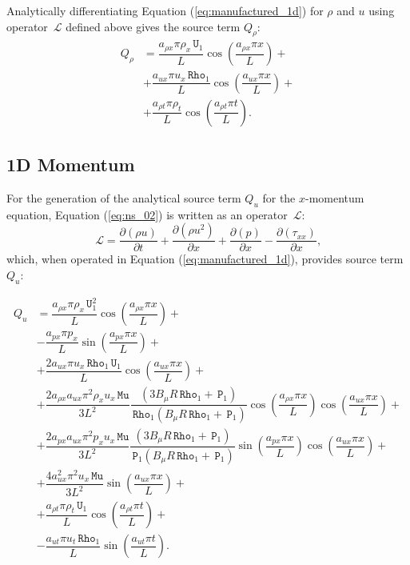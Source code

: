 \documentclass[10pt]{article}
\newcommand{\Diff}[2] {\dfrac{\partial( #1)}{\partial #2}}
\newcommand{\Rho}{\,\mathtt{Rho}}
\newcommand{\PP}{\,\mathtt{P}}
\newcommand{\U}{\,\mathtt{U}}
\newcommand{\Lo}{\,\mathcal{L}}
\newcommand{\MU}{\,\mathtt{Mu}}
\begin{document}
Analytically differentiating Equation (\ref{eq:manufactured_1d}) for $\rho$ and $u$  using operator $\Lo$ defined above gives  the source term $Q_{\rho}$:
\begin{equation}
 \begin{split}
Q_\rho &= \dfrac{a_{\rho x} \pi \rho_x \U_1}{L}\cos\left(\dfrac{a_{\rho x} \pi x}{L}\right) +\\
&+\dfrac{a_{ux} \pi u_x \Rho_1}{L}\cos\left(\dfrac{a_{ux} \pi x}{L}\right)+\\
&+\dfrac{a_{\rho t} \pi \rho_t }{L}\cos\left(\dfrac{a_{\rho t} \pi t}{L}\right) .
 \end{split}
\end{equation}


\subsection{1D Momentum}

For the generation of the analytical source term $Q_u$ for the $x$-momentum equation, Equation  (\ref{eq:ns_02}) is written as an  operator $\Lo$:
\begin{equation*}
 \Lo=\Diff{\rho u}{t} +\Diff{\rho u^2 }{x}+ \Diff{p}{x} -\Diff{\tau_{xx}}{x},
\end{equation*}
which, when operated in Equation (\ref{eq:manufactured_1d}), provides source term $Q_{u}$:

\begin{equation}
 \begin{split}
Q_u&=\dfrac{a_{\rho x} \pi \rho_x \U_1^2}{L}\cos\left(\dfrac{a_{\rho x} \pi x}{L}\right) +\\
&-\dfrac{ a_{px} \pi p_x}{L}\sin\left(\dfrac{a_{px} \pi x}{L}\right) +\\
&+  \dfrac{2a_{ux} \pi u_x \Rho_1 \U_1}{L}\cos\left(\dfrac{a_{ux} \pi x}{L}\right)+\\
&+ \dfrac{2 a_{\rho x} a_{ux} \pi^2 \rho_x u_x \MU}{3L^2}\dfrac{ (3 B_\mu R \Rho_1 +\PP_1) }{\Rho_1  (B_\mu R \Rho_1 +\PP_1)  }\cos\left(\dfrac{a_{\rho x} \pi x}{L}\right) \cos\left(\dfrac{a_{ux} \pi x}{L}\right)  +\\
&+\dfrac{2 a_{px} a_{ux} \pi^2 p_x u_x \MU}{3L^2}\dfrac{(3 B_\mu R \Rho_1 +\PP_1) }{\PP_1 (B_\mu R \Rho_1 +\PP_1)  } \sin\left(\dfrac{a_{px} \pi x}{L}\right) \cos\left(\dfrac{a_{ux} \pi x}{L}\right)  +\\
&+\dfrac{4 a_{ux}^2 \pi^2 u_x \MU }{3L^2}\sin\left(\dfrac{a_{ux} \pi x}{L}\right)+\\
&+ \dfrac{ a_{\rho t} \pi \rho_t \U_1}{L}\cos\left(\dfrac{a_{\rho t} \pi t}{L}\right)+\\
&-\dfrac{a_{ut} \pi u_t  \Rho_1 }{L}\sin\left(\dfrac{a_{ut} \pi t}{L}\right).
 \end{split}
\end{equation}
\end{document}
